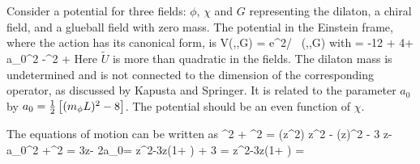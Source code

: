 Consider a potential for three fields: $\phi$, $\chi$ and $G$ representing the dilaton, a chiral field, and a glueball field with zero mass.  The potential in the Einstein frame, where the action has its canonical form, is
\be
V(\phi,\chi,G) = {\rm e}^{2\phi/} \, (\phi,\chi,G)
\ee
with
\be
{} = -12 + 4\phi + a_0\phi^2 -\tthalf\chi^2 + 
\label{V}
\ee
Here $\tilde{U}$ is more than quadratic in the fields.  The dilaton mass is undetermined and is not connected to the dimension of the corresponding operator, as discussed by Kapusta and Springer.  It is related to the parameter $a_0$ by $a_0 = \thalf \left[ \mL2-8 \right]$. The potential should be an even function of $\chi$. 

The equations of motion can be written as
\be
\chidot^2 + \Gdot^2 =  \Dz(z^2\phidot)
\label{C}
\ee
\be
\thalf {} z^2 \phiddot - \tthalf (z\phidot)^2 - 3  z\phi - a_0\phi^2 +\tthalf\chi^2
=  
\label{U}
\ee
\be
3z\phidot - 2a_0\phi = 
\label{phi}
\ee
\be
z^2\chiddot -3z\chidot \left(1+ \right) + 3\chi
= 
\label{chi}
\ee
\be
z^2\Gddot -3z\Gdot \left(1+ \right)
= 
\label{G}
\ee


